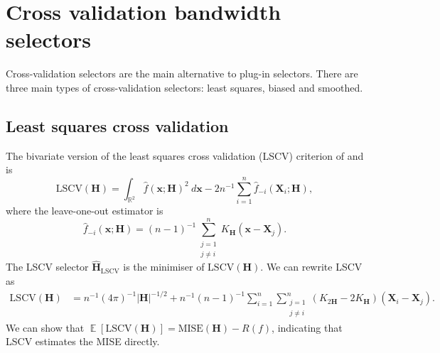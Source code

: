 \documentclass[a4paper,11pt]{article}
\renewcommand{\vec}[1]{\boldsymbol{#1}}
\newcommand{\mat}[1]{\mathbf{#1}}
\def\jneqi{\substack{j=1 \\ j\neq i}}
\def\Hmat{\mat{H}}
\def\MISE{\mathrm{MISE}}
\def\LSCV{\mathrm{LSCV}}
\def\vecx{\vec{x}}
\def\intr2{\int_{\boldsymbol{\mathbb{R}}^2}}
\DeclareMathOperator{\E}{\boldsymbol{\mathbb{E}}}
\begin{document}

\section{Cross validation bandwidth selectors}

Cross-validation selectors are the main alternative to plug-in selectors.
There are three main types of cross-validation selectors: 
least squares, biased and smoothed. 

\subsection{Least squares cross validation}
\label{sec:lscv}
The bivariate version of 
the least squares cross validation (LSCV) criterion of
\citet*{rudemo82} and \citet*{bowman84} is 
$$\LSCV (\Hmat) = \intr2 \hat{f}(\vec{x}; \Hmat)^2 \ d \vecx - 2n^{-1} \sum_{i=1}^n 
\hat{f}_{-i} (\vec{X}_i; \Hmat),$$
where the leave-one-out estimator is 
$$\hat{f}_{-i} (\vec{x}; \Hmat) = (n-1)^{-1} 
\sum_{\jneqi}^n K_\Hmat (\vec{x} - \vec{X}_j).$$ 
The LSCV selector $\hat{\Hmat}_\LSCV$ 
is the minimiser of $\LSCV(\Hmat)$. We can rewrite LSCV as
\begin{align}
\label{eq:lscv2}
\LSCV(\Hmat) & = n^{-1}  (4\pi)^{-1} |\Hmat|^{-1/2} + n^{-1} (n-1)^{-1} 
\sum_{i=1}^n \sum_{\jneqi}^n 
(K_{2\Hmat} - 2K_\Hmat) (\vec{X}_i - \vec{X}_j). 
\end{align}
We can show that $\E [\LSCV (\Hmat)] = \MISE(\Hmat) - R(f)$, indicating that
LSCV estimates the MISE directly.  
\end{document}
